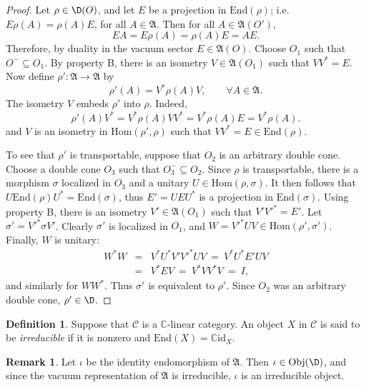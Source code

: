 \documentclass[12pt]{article}
\newcommand{\alg}[1]{\mathfrak{#1}}
\theoremstyle{definition}
\theoremstyle{definition}
\newtheorem{defn}[thm]{Definition}
\newtheorem{note}[thm]{Remark}
\theoremstyle{remark}
\newcommand{\Obj}{\mathrm{Obj}}
\def\2#1{{\mathcal #1}}
\def\7#1{{\mathbb #1}}
\newcommand{\Hom}{\mathrm{Hom}}
\newcommand{\End}{\mathrm{End}}
\def\id{\mathrm{id}}
\begin{document}
\begin{proof} Let $\rho \in \D (O)$, and let $E$ be a
  projection in $\End (\rho )$; i.e.\ $E\rho (A)=\rho
  (A)E$, for all $A\in \alg{A}$.  Then for all $A\in
  \alg{A}(O')$,$$ EA =E\rho (A)=\rho (A)E=AE.  $$
  Therefore, by duality in the vacuum sector $E\in
  \alg{A}(O)$.  Choose $O_1$ such that $O^{-}\subseteq
  O_1$.  By property B, there is an isometry $V\in
  \alg{A}(O_1)$ such that $VV^*=E$.  Now define $\rho
  ':\alg{A}\to \alg{A}$ by
  \begin{equation*} \rho '(A)=V^*\rho (A)V ,\qquad \forall A\in \alg{A}
    .\end{equation*} The isometry $V$ embeds $\rho '$ into $\rho$.  Indeed,
  \begin{equation*} \rho '(A)V^*=V^*\rho (A)VV^*=V^*\rho (A)E =V^*\rho (A)
    .\end{equation*} and $V$ is an isometry in $\Hom (\rho ',\rho )$ such that
  $VV^*=E\in \End (\rho )$.

  To see that $\rho '$ is transportable, suppose that
  $O_2$ is an arbitrary double cone.  Choose a double
  cone $O_3$ such that $O_3^{-}\subseteq O_2$.  Since
  $\rho$ is transportable, there is a morphism $\sigma$
  localized in $O_3$ and a unitary $U\in \Hom (\rho
  ,\sigma)$.  It then follows that $U\End (\rho
  )U^*=\End (\sigma )$, thus $E'=UEU^*$ is a projection
  in $\End (\sigma )$.  Using property B, there is an
  isometry $V'\in \alg{A}(O_1)$ such that
  $V'{V'}^*=E'$.  Let $\sigma '={V'}^*\sigma V'$.
  Clearly $\sigma '$ is localized in $O_1$, and
  $W={V'}^*UV\in \Hom (\rho ',\sigma ')$.  Finally, $W$
  is unitary:
  \begin{eqnarray*} W^*W &=& V^*U^*V'{V'}^*UV \: = \: V^*U^*E'UV \\
    &= & V^*EV \:= \: V^*VV^*V \: =\: I ,\end{eqnarray*} and similarly for $WW^*$.
  Thus $\sigma '$ is equivalent to $\rho '$.  Since $O_2$ was an arbitrary double
  cone, $\rho ' \in \D$.
\end{proof}

\begin{defn} Suppose that $\2C$ is a $\7C$-linear category.  An object $X$ in $\2C$
  is said to be \emph{irreducible} if it is nonzero and $\End (X)=\7C \id _X$.
\end{defn}

\begin{note} Let $\iota$ be the identity endomorphism of $\alg{A}$.  Then $\iota \in
  \Obj (\D )$, and since the vacuum representation of $\alg{A}$ is irreducible,
  $\iota$ is an irreducible object.  \end{note}
\end{document}
